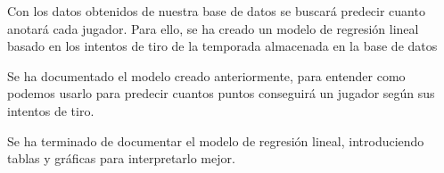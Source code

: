 \documentclass[idxtotoc,hyperref,openany]{labbook} %
\begin{document}
Con los datos obtenidos de nuestra base de datos se buscará predecir cuanto anotará cada jugador. Para ello, se ha creado un modelo de regresión lineal basado en los intentos de tiro de la temporada almacenada en la base de datos

Se ha documentado el modelo creado anteriormente, para entender como podemos usarlo para predecir cuantos puntos conseguirá un jugador según sus intentos de tiro.

Se ha terminado de documentar el modelo de regresión lineal, introduciendo tablas y gráficas para interpretarlo mejor.
\end{document}
